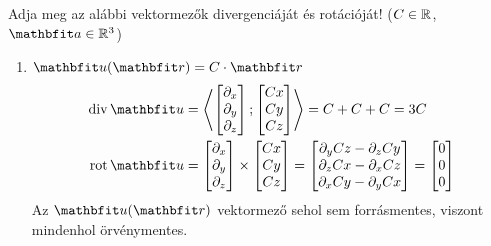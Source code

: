 \documentclass{szb-solution}
\begin{document}
Adja meg az alábbi vektormezők divergenciáját és rotációját!
($C \in \mathbb{R}$, $\rvec a \in \Reals^3$)
\begin{enumerate}
  \item $\rvec u(\coordvec) = C \cdot \coordvec$
        \begin{align*}
          \Div \rvec u
           & = \scalar{
            \begin{bmatrix}
              \partial_x \\ \partial_y \\ \partial_z
            \end{bmatrix}
          }{
            \begin{bmatrix}
              Cx \\ Cy \\ Cz
            \end{bmatrix}
          } = C + C + C = 3C
          \\
          \rot \rvec u
           & =
          \begin{bmatrix}
            \partial_x \\ \partial_y \\ \partial_z
          \end{bmatrix}
          \times
          \begin{bmatrix}
            Cx \\ Cy \\ Cz
          \end{bmatrix}
          =
          \begin{bmatrix}
            \partial_y Cz - \partial_z Cy \\
            \partial_z Cx - \partial_x Cz \\
            \partial_x Cy - \partial_y Cx
          \end{bmatrix}
          =
          \begin{bmatrix}
            0 \\ 0 \\ 0
          \end{bmatrix}
        \end{align*}
        Az $\rvec u(\coordvec)$ vektormező sehol sem forrásmentes, viszont
        mindenhol örvénymentes.


\end{enumerate}
\end{document}
